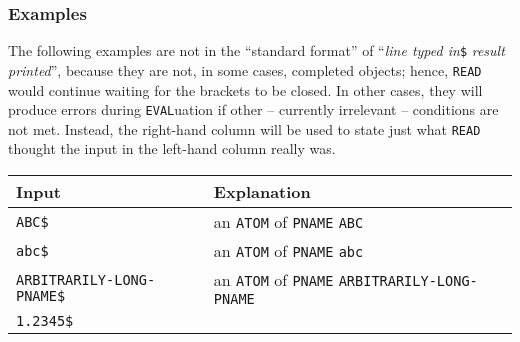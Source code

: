\documentclass[a4paper]{scrbook}
\begin{document}
\subsubsection{Examples}\label{examples}

The following examples are not in the ``standard format'' of ``\emph{line typed in}\texttt{\$} \emph{result printed}'',
because they are not, in some cases, completed objects; hence, \texttt{READ} would continue waiting for the brackets to be
closed. In other cases, they will produce errors during \texttt{EVAL}uation if other -- currently irrelevant -- conditions
are not met. Instead, the right-hand column will be used to state just what \texttt{READ} thought the input in the
left-hand column really was.

\begin{longtable}[]{@{}ll@{}}
\toprule
\begin{minipage}[b]{0.27\columnwidth}\raggedright\strut
Input\strut
\end{minipage} & \begin{minipage}[b]{0.67\columnwidth}\raggedright\strut
Explanation\strut
\end{minipage}\tabularnewline
\midrule
\endhead
\begin{minipage}[t]{0.27\columnwidth}\raggedright\strut
\texttt{ABC\$}\strut
\end{minipage} & \begin{minipage}[t]{0.67\columnwidth}\raggedright\strut
an \texttt{ATOM} of \texttt{PNAME} \texttt{ABC}\strut
\end{minipage}\tabularnewline
\begin{minipage}[t]{0.27\columnwidth}\raggedright\strut
\texttt{abc\$}\strut
\end{minipage} & \begin{minipage}[t]{0.67\columnwidth}\raggedright\strut
an \texttt{ATOM} of \texttt{PNAME} \texttt{abc}\strut
\end{minipage}\tabularnewline
\begin{minipage}[t]{0.27\columnwidth}\raggedright\strut
\texttt{ARBITRARILY-LONG-PNAME\$}\strut
\end{minipage} & \begin{minipage}[t]{0.67\columnwidth}\raggedright\strut
an \texttt{ATOM} of \texttt{PNAME} \texttt{ARBITRARILY-LONG-PNAME}\strut
\end{minipage}\tabularnewline
\begin{minipage}[t]{0.27\columnwidth}\raggedright\strut
\texttt{1.2345\$}\strut
\end{minipage} & \begin{minipage}[t]{0.67\columnwidth}\raggedright\strut

\end{minipage}
\end{longtable}
\end{document}
